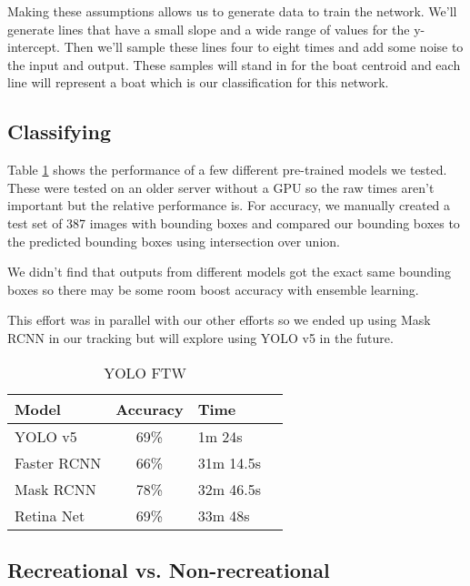 \documentclass[10pt,twocolumn,letterpaper]{article}
\begin{document}
Making these assumptions allows us to generate data to train the network. We'll generate lines that have a small slope and a wide range of values for the y-intercept. Then we'll sample these lines four to eight times and add some noise to the input and output. These samples will stand in for the boat centroid and each line will represent a boat which is our classification for this network.


\subsection{Classifying}

Table \ref{tab:ModelPerf} shows the performance of a few different pre-trained models we tested. These were tested on an older server without a GPU so the raw times aren't important but the relative performance is. For accuracy, we manually created a test set of 387 images with bounding boxes and compared our bounding boxes to the predicted bounding boxes using intersection over union.

We didn't find that outputs from different models got the exact same bounding boxes so there may be some room boost accuracy with ensemble learning.

This effort was in parallel with our other efforts so we ended up using Mask RCNN in our tracking but will explore using YOLO v5 in the future.

\begin{table}[t]
  \centering
  \begin{tabular}{@{}lc@{}lc@{}}
    \toprule
    Model & Accuracy\nobreakspace\nobreakspace\nobreakspace & \nobreakspace\nobreakspace Time \\
    \midrule
    YOLO v5\cite{pytorch_yolov5} & 69\% & 1m 24s \\
    Faster RCNN\cite{pytorch_fasterrcnn_resnet50_fpn} & 66\% & 31m 14.5s \\
    Mask RCNN\cite{pytorch_maskrcnn_resnet50_fpn} & 78\% & 32m 46.5s\\
    Retina Net\cite{pytorch_retinanet_resnet50_fpn} & 69\% & 33m 48s\\
    \bottomrule
  \end{tabular}
  \caption{YOLO FTW}
  \label{tab:ModelPerf}
\end{table}


\subsection{Recreational vs. Non-recreational}
\end{document}
